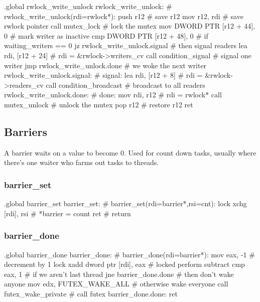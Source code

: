 \begin{asm}
.global rwlock_write_unlock
rwlock_write_unlock:			    # rwlock_write_unlock(rdi=rwlock*):
	push	r12			    #   save r12
	mov	r12, rdi		    #   save rwlock pointer
	call	mutex_lock		    #   lock the mutex
	mov	DWORD PTR [r12 + 44], 0	    #   mark writer as inactive
	cmp	DWORD PTR [r12 + 48], 0     #   if waiting_writers == 0
	jz	rwlock_write_unlock.signal  #   then signal readers
	lea	rdi, [r12 + 24]		    #   rdi = &rwlock->writers_cv
	call	condition_signal	    #   signal one writer
	jmp	rwlock_write_unlock.done    #   we woke the next writer
rwlock_write_unlock.signal:		    # signal:
	lea	rdi, [r12 + 8]		    #   rdi = &rwlock->readers_cv
	call	condition_broadcast	    #   broadcast to all readers
rwlock_write_unlock.done:		    # done:
	mov	rdi, r12		    #   rdi = rwlock*
	call	mutex_unlock		    #   unlock the mutex
	pop	r12			    #   restore r12
	ret
\end{asm}


\subsection{Barriers}

A barrier waits on a value to become 0. Used for count down tasks, usually
where there's one waiter who farms out tasks to threads.

\subsubsection{barrier\_set}

\begin{asm}
.global barrier_set
barrier_set:				    # barrier_set(rdi=barrier*,rsi=cnt):
    lock xchg [rdi], rsi		    #   *barrier = count
    ret					    #   return
\end{asm}

\subsubsection{barrier\_done}

\begin{asm}
.global barrier_done
barrier_done:				    # barrier_done(rdi=barrier*):
	mov	eax, -1			    #   decrement by 1
	lock xadd dword ptr [rdi], eax	    #   locked perform subtract
	cmp	eax, 1			    #   if we aren't last thread
	jne	barrier_done.done	    #   then don't wake anyone
	mov	edx, FUTEX_WAKE_ALL	    #   otherwise wake everyone
	call	futex_wake_private	    #   call futex
barrier_done.done:
	ret
\end{asm}

